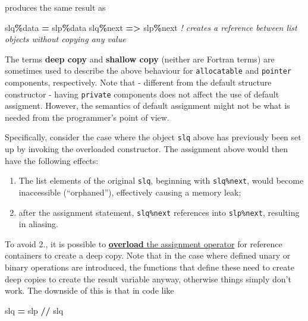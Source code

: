 \documentclass[
  paper=a4,
  ,captions=tableheading
]{scrartcl}
\newenvironment{Shaded}{\begin{snugshade}}{\end{snugshade}}
\newcommand{\CommentTok}[1]{\textcolor[rgb]{0.56,0.35,0.01}{\textit{#1}}}
\newcommand{\KeywordTok}[1]{\textcolor[rgb]{0.13,0.29,0.53}{\textbf{#1}}}
\newcommand{\NormalTok}[1]{#1}
\newcommand{\OperatorTok}[1]{\textcolor[rgb]{0.81,0.36,0.00}{\textbf{#1}}}
\providecommand{\tightlist}{%
  \setlength{\itemsep}{0pt}\setlength{\parskip}{0pt}}
\begin{document}
produces the same result as

\begin{Shaded}
\begin{Highlighting}[]
\NormalTok{slq}\OperatorTok{\%}\NormalTok{data }\KeywordTok{=}\NormalTok{ slp}\OperatorTok{\%}\NormalTok{data}
\NormalTok{slq}\OperatorTok{\%}\NormalTok{next }\KeywordTok{=}\OperatorTok{\textgreater{}}\NormalTok{ slp}\OperatorTok{\%}\NormalTok{next  }\CommentTok{! creates a reference between list objects without copying any value}
\end{Highlighting}
\end{Shaded}

The terms \textbf{deep copy} and \textbf{shallow copy} (neither are
Fortran terms) are sometimes used to describe the above behaviour for
\texttt{allocatable} and \texttt{pointer} components, respectively. Note
that - different from the default structure constructor - having
\texttt{private} components does not affect the use of default
assigment. However, the semantics of default assignment might not be
what is needed from the programmer's point of view.

Specifically, consider the case where the object \texttt{slq} above has
previously been set up by invoking the overloaded constructor. The
assignment above would then have the following effects:

\begin{enumerate}
\def\labelenumi{\arabic{enumi}.}
\tightlist
\item
  The list elements of the original \texttt{slq}, beginning with
  \texttt{slq\%next}, would become inaccessible (``orphaned''),
  effectively causing a memory leak;
\item
  after the assignment statement, \texttt{slq\%next} references into
  \texttt{slp\%next}, resulting in aliasing.
\end{enumerate}

To avoid 2., it is possible to
\href{https://en.wikipedia.org/wiki/Fortran_95_language_features\#Derived-data_types}{\textbf{overload}
the assignment operator} for reference containers to create a deep copy.
Note that in the case where defined unary or binary operations are
introduced, the functions that define these need to create deep copies
to create the result variable anyway, otherwise things simply don't
work. The downside of this is that in code like

\begin{Shaded}
\begin{Highlighting}[]
\NormalTok{slq }\KeywordTok{=}\NormalTok{ slp }\KeywordTok{//}\NormalTok{ slq}
\end{Highlighting}
\end{Shaded}
\end{document}

